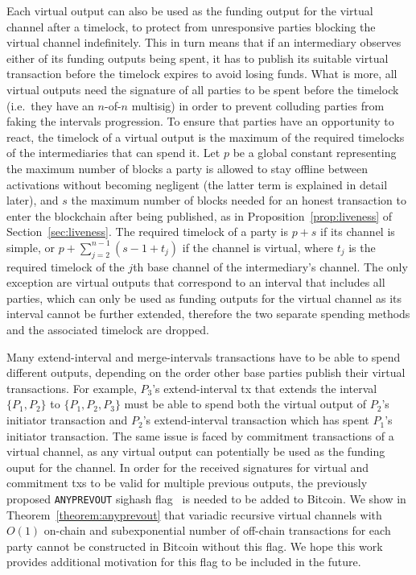   Each virtual output can also be used as the funding output for the virtual
  channel after a timelock, to protect from unresponsive parties blocking the
  virtual channel indefinitely. This in turn means that if an intermediary
  observes either of its funding outputs being spent, it has to publish its
  suitable virtual transaction before the timelock expires to avoid losing
  funds. What is more, all virtual outputs need the signature of all parties to
  be spent before the timelock (i.e.\ they have an $n$-of-$n$ multisig) in order
  to prevent colluding parties from faking the intervals progression. To ensure
  that parties have an opportunity to react, the timelock of a virtual output is
  the maximum of the required timelocks of the intermediaries that can spend it.
  Let $p$ be a global constant representing the maximum number of blocks a party
  is allowed to stay offline between activations without becoming negligent
  (the latter term is explained in detail later), and
  $s$ the maximum number of blocks needed for an honest transaction to enter the
  blockchain after being published, as in Proposition~\ref{prop:liveness} of
  Section~\ref{sec:liveness}.
  The required timelock of a party is $p + s$ if its channel is simple,  or $p +
  \sum\limits_{j = 2}^{n - 1}(s - 1 + t_j)$ if the channel is virtual, where
  $t_j$ is the required timelock of the $j$th base channel
  of the intermediary's channel. The only exception are virtual outputs that
  correspond to an interval that includes all parties, which can only be used as
  funding outputs for the virtual channel as its interval cannot be further
  extended, therefore the two separate spending methods and the associated
  timelock are dropped.

  Many extend-interval and merge-intervals transactions have to be able to spend
  different outputs, depending on the order other base parties publish their
  virtual transactions. For example, $P_3$'s extend-interval tx that extends the
  interval $\{P_1, P_2\}$ to $\{P_1, P_2, P_3\}$ must be able to spend both
  the virtual output of $P_2$'s initiator transaction and $P_2$'s
  extend-interval transaction which has spent $P_1$'s initiator transaction. The
  same issue is faced by commitment transactions of a virtual channel, as any
  virtual output can potentially be used as the funding ouput for the channel.
  In order for the received signatures for virtual and commitment txs to be
  valid for multiple previous outputs, the previously proposed
  \texttt{ANYPREVOUT} sighash flag~\cite{anyprevout} is needed to be added to
  Bitcoin. We show in Theorem~\ref{theorem:anyprevout} that variadic recursive
  virtual channels with $O(1)$ on-chain and subexponential number of off-chain
  transactions for each party cannot be constructed in Bitcoin without this
  flag. We hope this work provides additional motivation for this flag to be
  included in the future.

